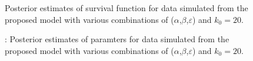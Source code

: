 \documentclass[
  sn-basic,
]{sn-jnl}
\theoremstyle{plain}
\theoremstyle{plain}
\theoremstyle{remark}
\begin{document}
\begin{figure}


\caption{\label{fig-rec1}Posterior estimates of survival function for
data simulated from the proposed model with various combinations of
(\(\alpha\),\(\beta\),\(\varepsilon\)) and \(k_0=20\).}

\end{figure}%

\begin{figure}


\caption{\label{fig-rec2}: Posterior estimates of paramters for data
simulated from the proposed model with various combinations of
(\(\alpha\),\(\beta\),\(\varepsilon\)) and \(k_0=20\).}

\end{figure}%
\end{document}
